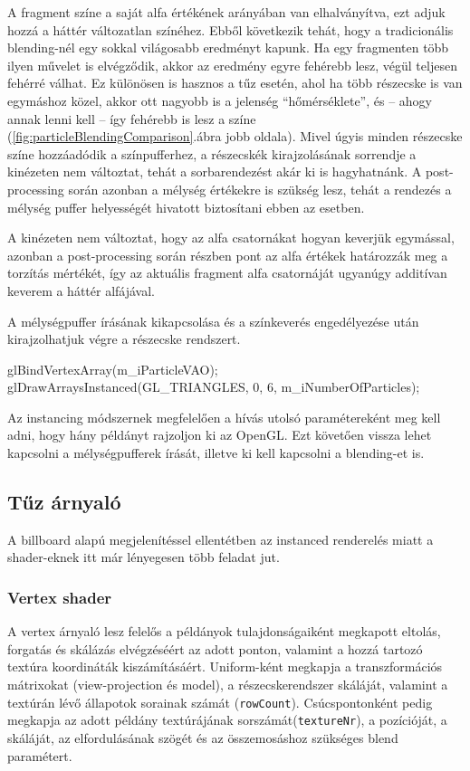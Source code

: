A fragment színe a saját alfa értékének arányában van elhalványítva, ezt adjuk hozzá a háttér változatlan színéhez. Ebből következik tehát, hogy a tradicionális blending-nél egy sokkal világosabb eredményt kapunk. Ha egy fragmenten több ilyen művelet is elvégződik, akkor az eredmény egyre fehérebb lesz, végül teljesen fehérré válhat. Ez különösen is hasznos a tűz esetén, ahol ha több részecske is van egymáshoz közel, akkor ott nagyobb is a jelenség ``hőmérséklete'', és -- ahogy annak lenni kell -- így fehérebb is lesz a színe (\ref{fig:particleBlendingComparison}.ábra jobb oldala). Mivel úgyis minden részecske színe hozzáadódik a színpufferhez, a részecskék kirajzolásának sorrendje a kinézeten nem változtat, tehát a sorbarendezést akár ki is hagyhatnánk. A post-processing során azonban a mélység értékekre is szükség lesz, tehát a rendezés a mélység puffer helyességét hivatott biztosítani ebben az esetben.

A kinézeten nem változtat, hogy az alfa csatornákat hogyan keverjük egymással, azonban a post-processing során részben pont az alfa értékek határozzák meg a torzítás mértékét, így az aktuális fragment alfa csatornáját ugyanúgy additívan keverem a háttér alfájával.

A mélységpuffer írásának kikapcsolása és a színkeverés engedélyezése után kirajzolhatjuk végre a részecske rendszert.
\begin{cpp}
glBindVertexArray(m_iParticleVAO);
glDrawArraysInstanced(GL_TRIANGLES, 0, 6, m_iNumberOfParticles);
\end{cpp}
Az instancing módszernek megfelelően a hívás utolsó paramétereként meg kell adni, hogy hány példányt rajzoljon ki az OpenGL. Ezt követően vissza lehet kapcsolni a mélységpufferek írását, illetve ki kell kapcsolni a blending-et is.

\subsection{Tűz árnyaló}
A billboard alapú megjelenítéssel ellentétben az instanced renderelés miatt a shader-eknek itt már lényegesen több feladat jut. 

\subsubsection{Vertex shader}
A vertex árnyaló lesz felelős a példányok tulajdonságaiként megkapott eltolás, forgatás és skálázás elvégzéséért az adott ponton, valamint a hozzá tartozó textúra koordináták kiszámításáért. Uniform-ként megkapja a transzformációs mátrixokat (view-projection és model), a részecskerendszer skáláját, valamint a textúrán lévő állapotok sorainak számát (\texttt{rowCount}). Csúcspontonként pedig megkapja az adott példány textúrájának sorszámát(\texttt{textureNr}), a pozícióját, a skáláját, az elfordulásának szögét és az összemosáshoz szükséges blend paramétert. 


